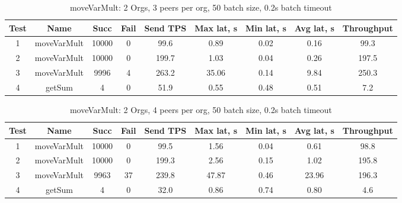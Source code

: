 \begin{appendices}
\begin{table}[H]
\begin{center}
\begin{tabular}{ |c|c|c|c|c|c|c|c|c| }
 \hline
  Test & Name & Succ  & Fail & Send TPS & Max lat, s & Min lat, s & Avg lat, s & Throughput \\
 \hline
 \hline
 1    & moveVarMult & 10000 & 0    & 99.6  & 0.89      & 0.02      & 0.16      & 99.3   \\
 \hline
 2    & moveVarMult & 10000 & 0    & 199.7 & 1.03      & 0.04      & 0.26      & 197.5  \\
 \hline
 3    & moveVarMult & 9996  & 4    & 263.2 & 35.06     & 0.14      & 9.84      & 250.3  \\
 \hline
 4    & getSum      & 4     & 0    & 51.9  & 0.55      & 0.48      & 0.51      & 7.2    \\
 \hline
\end{tabular}
\end{center}
\caption{moveVarMult: 2 Orgs, 3 peers per org, 50 batch size, 0.2s batch timeout}
\end{table}

\begin{table}[H]
\begin{center}
\begin{tabular}{ |c|c|c|c|c|c|c|c|c| }
 \hline
  Test & Name & Succ  & Fail & Send TPS & Max lat, s & Min lat, s & Avg lat, s & Throughput \\
 \hline
 \hline
 1    & moveVarMult & 10000 & 0    & 99.5  & 1.56      & 0.04      & 0.61      & 98.8   \\
 \hline
 2    & moveVarMult & 10000 & 0    & 199.3 & 2.56      & 0.15      & 1.02      & 195.8  \\
 \hline
 3    & moveVarMult & 9963  & 37   & 239.8 & 47.87     & 0.46      & 23.96     & 196.3  \\
 \hline
 4    & getSum      & 4     & 0    & 32.0  & 0.86      & 0.74      & 0.80      & 4.6    \\
 \hline
\end{tabular}
\end{center}
\caption{moveVarMult: 2 Orgs, 4 peers per org, 50 batch size, 0.2s batch timeout}
\end{table}


\end{appendices}
